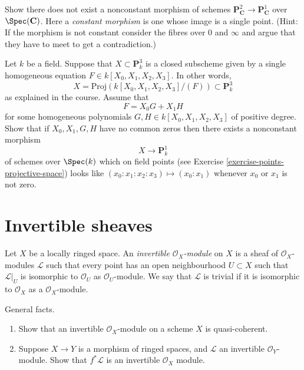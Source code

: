 \begin{exercise}
\label{exercise-no-nonconstant-morphism-proj}
Show there does not exist a nonconstant morphism of schemes
$\mathbf{P}^2_{\mathbf{C}} \to \mathbf{P}^1_{\mathbf{C}}$
over $\Spec(\mathbf{C})$. Here a {\it constant morphism} is
one whose image is a single point.
(Hint: If the morphism is not constant consider the fibres over
$0$ and $\infty$ and argue that they have to meet to get a contradiction.)
\end{exercise}

\begin{exercise}
\label{exercise-nonconstant-morphism}
Let $k$ be a field.
Suppose that $X \subset \mathbf{P}^3_k$ is a closed subscheme
given by a single homogeneous equation $F \in k[X_0, X_1, X_2, X_3]$.
In other words,
$$
X = \text{Proj}(k[X_0, X_1, X_2, X_3]/(F)) \subset \mathbf{P}^3_k
$$
as explained in the course. Assume that
$$
F = X_0 G + X_1 H
$$
for some homogeneous polynomials $G, H \in k[X_0, X_1, X_2, X_3]$
of positive degree. Show that if $X_0, X_1, G, H$ have no common zeros
then there exists a nonconstant morphism
$$
X \longrightarrow \mathbf{P}^1_k
$$
of schemes over $\Spec(k)$
which on field points (see Exercise \ref{exercise-points-projective-space})
looks like $(x_0 : x_1 : x_2 : x_3) \mapsto (x_0 : x_1)$ whenever
$x_0$ or $x_1$ is not zero.
\end{exercise}





\section{Invertible sheaves}
\label{section-invertible-sheaves}

\begin{definition}
\label{definition-invertible-sheaf}
Let $X$ be a locally ringed space.
An {\it invertible ${\mathcal O}_X$-module} on $X$
is a sheaf of ${\mathcal O}_X$-modules ${\mathcal L}$ such that every point
has an open neighbourhood $U \subset X$ such that ${\mathcal L}|_U$
is isomorphic to ${\mathcal O}_U$ as ${\mathcal O}_U$-module.
We say that ${\mathcal L}$ is trivial if it is isomorphic to
${\mathcal O}_X$ as a ${\mathcal O}_X$-module.
\end{definition}

\begin{exercise}
\label{exercise-general-facts-invertible}
General facts.
\begin{enumerate}
\item Show that an invertible ${\mathcal O}_X$-module on
a scheme $X$ is quasi-coherent.
\item Suppose $X\to Y$ is a morphism of ringed spaces,
and ${\mathcal L}$ an invertible ${\mathcal O}_Y$-module.
Show that $f^\ast {\mathcal L}$ is an invertible ${\mathcal O}_X$ module.
\end{enumerate}
\end{exercise}

